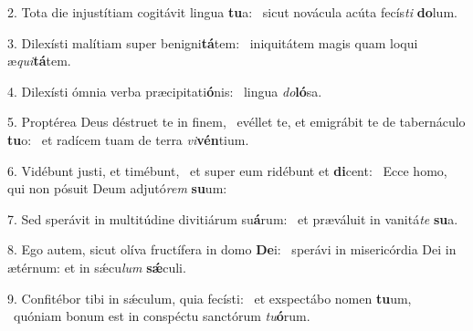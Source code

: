 2. Tota die injustítiam cogitávit lingua \textbf{tu}a: \ast\  sicut novácula acúta fecís\textit{ti} \textbf{do}lum.\

3. Dilexísti malítiam super benigni\textbf{tá}tem: \ast\  iniquitátem magis quam loqui æ\textit{qui}\textbf{tá}tem.\

4. Dilexísti ómnia verba præcipitati\textbf{ó}nis: \ast\  lingua \textit{do}\textbf{ló}sa.\

5. Proptérea Deus déstruet te in finem, \dag\  evéllet te, et emigrábit te de tabernáculo \textbf{tu}o: \ast\  et radícem tuam de terra \textit{vi}\textbf{vén}tium.\

6. Vidébunt justi, et timébunt, \dag\  et super eum ridébunt et \textbf{di}cent: \ast\  Ecce homo, qui non pósuit Deum adjutó\textit{rem} \textbf{su}um:\

7. Sed sperávit in multitúdine divitiárum su\textbf{á}rum: \ast\  et præváluit in vanitá\textit{te} \textbf{su}a.\

8. Ego autem, sicut olíva fructífera in domo \textbf{De}i: \ast\  sperávi in misericórdia Dei in ætérnum: et in sǽcu\textit{lum} \textbf{sǽ}culi.\

9. Confitébor tibi in sǽculum, quia fecísti: \dag\  et exspectábo nomen \textbf{tu}um, \ast\  quóniam bonum est in conspéctu sanctórum \textit{tu}\textbf{ó}rum.\

